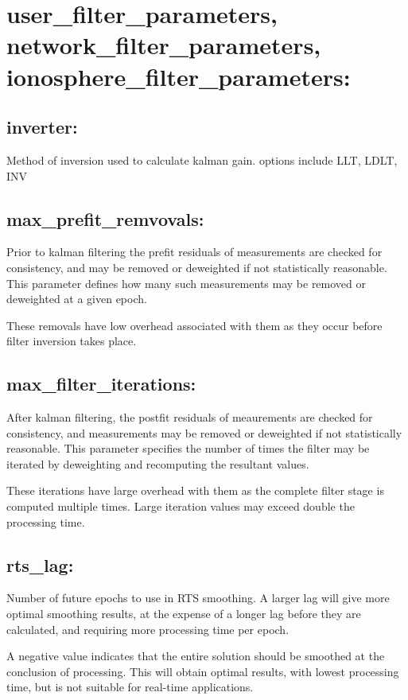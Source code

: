 \section{user\_filter\_parameters, network\_filter\_parameters, ionosphere\_filter\_parameters:}

\subsection{inverter:}
Method of inversion used to calculate kalman gain. options include 
LLT,
LDLT,
INV

\subsection{max\_prefit\_remvovals:}
Prior to kalman filtering the prefit residuals of measurements are checked for consistency, and may be removed or deweighted if not statistically reasonable. This parameter defines how many such measurements may be removed or deweighted at a given epoch.

These removals have low overhead associated with them as they occur before filter inversion takes place.

\subsection{max\_filter\_iterations:}
After kalman filtering, the postfit residuals of meaurements are checked for consistency, and measurements may be removed or deweighted if not statistically reasonable. This parameter specifies the number of times the filter may be iterated by deweighting and recomputing the resultant values.

These iterations have large overhead with them as the complete filter stage is computed multiple times. Large iteration values may exceed double the processing time.


\subsection{rts\_lag:}
Number of future epochs to use in RTS smoothing. A larger lag will give more optimal smoothing results, at the expense of a longer lag before they are calculated, and requiring more processing time per epoch.

A negative value indicates that the entire solution should be smoothed at the conclusion of processing. This will obtain optimal results, with lowest processing time, but is not suitable for real-time applications.

